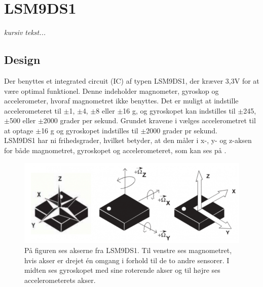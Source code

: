 \section{LSM9DS1}\label{sec_design_LSM9DS1}
\textit{kursiv tekst...}
\subsection{Design}
Der benyttes et integrated circuit (IC) af typen LSM9DS1, der kræver 3,3V for at være optimal funktionel. Denne indeholder magnometer, gyroskop og accelerometer, hvoraf magnometret ikke benyttes. Det er muligt at indstille accelerometeret til $\pm$1, $\pm$4, $\pm$8 eller $\pm$16 g, og gyroskopet kan indstilles til $\pm$245, $\pm$500 eller $\pm$2000 grader per sekund. \citep{Jimb02016,STMicroelectronics2016} Grundet kravene i  vælges accelerometret til at optage $\pm$16 g og gyroskopet indstilles til $\pm$2000 grader pr sekund. \\
LSM9DS1 har ni frihedsgrader, hvilket betyder, at den måler i x-, y- og z-aksen for både magnometret, gyroskopet og accelerometeret, som kan ses på . %
\citep{STMicroelectronics2016}\newline 
\begin{figure}[H]
	\centering
	\includegraphics[scale=0.6]{figures/cDesign/LSM9DS1.png}
	\caption{På figuren ses akserne fra LSM9DS1. Til venstre ses magnometret, hvis akser er drejet én omgang i forhold til de to andre sensorer. I midten ses gyroskopet med sine roterende akser og til højre ses accelerometerets akser.\citep{Jimb02016}}
	\label{vores_IC}
\end{figure}

